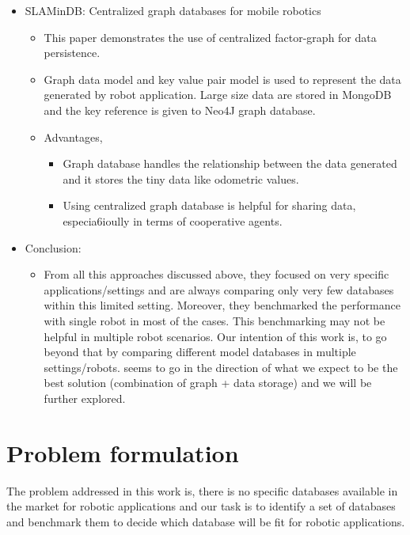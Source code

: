 \documentclass[12pt]{article}
\begin{document}
\begin{itemize}
\item SLAMinDB: Centralized graph databases for mobile robotics\cite{reference4}

\begin{itemize}
\item This paper demonstrates the use of centralized factor-graph for data persistence.

\item Graph data model and key value pair model is used to represent the data generated by robot application. Large size data are stored in MongoDB and the key reference is given to Neo4J graph database.
\item Advantages,
\begin{itemize}
\item Graph database handles the relationship between the data generated and it stores the tiny data like odometric values.

\item Using centralized graph database is helpful for sharing data, especia6ioully in terms of cooperative agents.
\end{itemize}
\end{itemize}

\item Conclusion:
\begin{itemize}
\item From all this approaches discussed above, they focused on very specific applications/settings and are always comparing only very few databases within this limited setting. Moreover, they benchmarked the performance with single robot in most of the cases. This benchmarking may not be helpful in multiple robot scenarios. Our intention of this work is, to go beyond that by comparing different model databases in multiple settings/robots. \cite{reference4} seems to go in the direction of what we expect to be the best solution (combination of graph + data storage) and we will be further explored.
\end{itemize}
\end{itemize}

\section{Problem formulation}

The problem addressed in this work is, there is no specific databases available in the market for robotic applications and our task is to identify a set of databases and benchmark them to decide which database will be fit for robotic applications.
\end{document}
